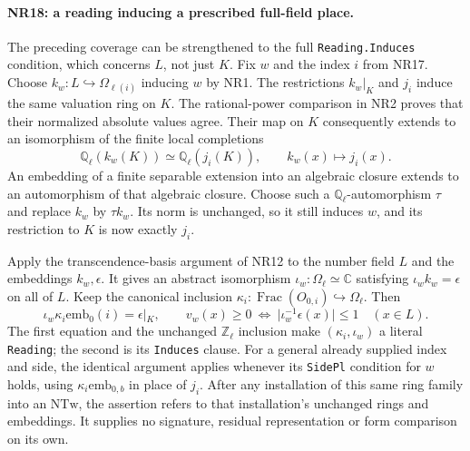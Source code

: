 \paragraph{NR18: a reading inducing a prescribed full-field place.}
The preceding coverage can be strengthened to the full
\texttt{Reading.Induces} condition, which concerns $L$, not just
$K$. Fix $w$ and the index $i$ from NR17. Choose
$k_w:L\hookrightarrow\Omega_{\ell(i)}$ inducing $w$ by NR1.
The restrictions $k_w|_K$ and $j_i$ induce the same valuation ring
on $K$. The rational-power comparison in NR2 proves that their
normalized absolute values agree. Their map on $K$ consequently
extends to an isomorphism of the finite local completions
\[
       \mathbb Q_\ell(k_w(K))\simeq\mathbb Q_\ell(j_i(K)),
                              \qquad k_w(x)\longmapsto j_i(x).
                                                               \tag{NR.34}
\]
An embedding of a finite separable extension into an algebraic
closure extends to an automorphism of that algebraic closure.
Choose such a $\mathbb Q_\ell$-automorphism $\tau$ and replace
$k_w$ by $\tau k_w$. Its norm is unchanged, so it still induces
$w$, and its restriction to $K$ is now exactly $j_i$.

Apply the transcendence-basis argument of NR12 to the number
field $L$ and the embeddings $k_w,\epsilon$. It gives an abstract
isomorphism $\iota_w:\Omega_\ell\simeq\mathbb C$ satisfying
$\iota_w k_w=\epsilon$ on all of $L$. Keep the canonical inclusion
$\kappa_i:\operatorname{Frac}(O_{0,i})\hookrightarrow\Omega_\ell$.
Then
\[
 \iota_w\kappa_i\mathrm{emb}_0(i)=\epsilon|_K,\qquad
 v_w(x)\ge0\ \Longleftrightarrow\
             |\iota_w^{-1}\epsilon(x)|\le1\quad(x\in L).
                                                               \tag{NR.35}
\]
The first equation and the unchanged $\mathbb Z_\ell$ inclusion
make $(\kappa_i,\iota_w)$ a literal \texttt{Reading}; the second
is its \texttt{Induces} clause. For a general already supplied
index and side, the identical argument applies whenever its
\texttt{SidePl} condition for $w$ holds, using
$\kappa_i\mathrm{emb}_{0,b}$ in place of $j_i$.
After any installation of this same ring family into an
$\mathrm{NTw}$, the assertion refers to that installation's
unchanged rings and embeddings. It supplies no signature,
residual representation or form comparison on its own.

